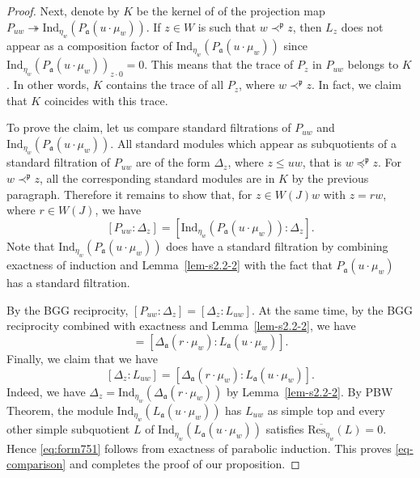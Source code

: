 \documentclass[a4paper]{amsart}
\newcommand{\tto}{\twoheadrightarrow}
\begin{document}
\begin{proof}
Next, denote by $K$ be the kernel of of the projection map 
$P_{uw}\tto \mathrm{Ind}_{\eta_w}(P_\mathfrak{a}(u\cdot \mu_w))$.
If $z\in W$ is such that $w\prec^\mathfrak{p}z$, then 
$L_z$ does not appear as a composition factor of 
$\mathrm{Ind}_{\eta_w}(P_\mathfrak{a}(u\cdot \mu_w))$ since
$\mathrm{Ind}_{\eta_w}(P_\mathfrak{a}(u\cdot \mu_w))_{z\cdot 0}=0$.
This means that the trace of $P_z$ in $P_{uw}$ belongs to $K$.
In other words, $K$ contains the trace of all $P_z$,
where $w\prec^\mathfrak{p}z$. In fact, we claim that $K$
coincides with this trace.

To prove the claim, let us compare standard filtrations of 
$P_{uw}$ and $\mathrm{Ind}_{\eta_w}(P_\mathfrak{a}(u\cdot \mu_w))$.
All standard modules which appear as subquotients of a standard
filtration of $P_{uw}$ are of the form $\Delta_z$, where $z\leq uw$,
that is $w{\preceq^\mathfrak{p}}z$.  For $w\prec^\mathfrak{p}z$,
all the corresponding standard modules are in $K$ by the previous
paragraph. Therefore it remains to show that, for 
$z\in W(J)w$ with $z=rw$, where $r\in W(J)$, we have
\begin{equation}\label{eq-comparison}
[P_{uw}:\Delta_z]=
[\mathrm{Ind}_{\eta_w}(P_\mathfrak{a}(u\cdot \mu_w)):\Delta_z]. 
\end{equation}
Note that $\mathrm{Ind}_{\eta_w}(P_\mathfrak{a}(u\cdot \mu_w))$
does have a standard filtration by combining exactness of 
induction and Lemma~\ref{lem-s2.2-2} with the fact that 
$P_\mathfrak{a}(u\cdot \mu_w)$ has a standard filtration.

By the BGG reciprocity, $[P_{uw}:\Delta_z]=[\Delta_z:L_{uw}]$.
At the same time, by the BGG reciprocity combined with
exactness and Lemma~\ref{lem-s2.2-2}, we have
\begin{displaymath}
[\mathrm{Ind}_{\eta_w}(P_\mathfrak{a}(u\cdot \mu_w)):\Delta_z]=
[\Delta_\mathfrak{a}(r\cdot \mu_w):L_\mathfrak{a}(u\cdot \mu_w)].
\end{displaymath}
Finally, { we claim that we have
\begin{equation}\label{eq:form751}
[\Delta_z:L_{uw}]= 
[\Delta_\mathfrak{a}(r\cdot {\mu}_w):
L_\mathfrak{a}(u\cdot {\mu}_w)]. 
\end{equation}
Indeed, we have 
$\Delta_z=\mathrm{Ind}_{\eta_w}(\Delta_\mathfrak{a}(r\cdot {\mu}_w))$
by Lemma~\ref{lem-s2.2-2}.
By PBW Theorem, 
the module $\mathrm{Ind}_{\eta_w}(L_\mathfrak{a}(u\cdot {\mu}_w))$
has $L_{uw}$ as simple top and every other simple subquotient $L$ of
$\mathrm{Ind}_{\eta_w}(L_\mathfrak{a}(u\cdot {\mu}_w))$
satisfies $\overline{\mathrm{Res}_{\eta_w}}(L)=0$.
Hence \eqref{eq:form751} follows from exactness of parabolic induction. 
}
This proves \eqref{eq-comparison} and completes
the proof of our proposition.
\end{proof}
\end{document}
